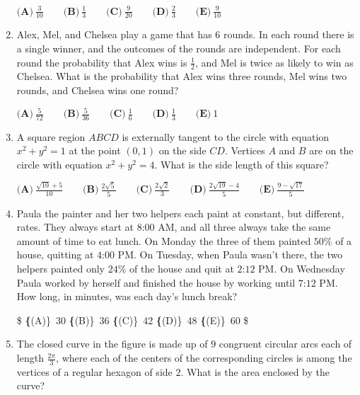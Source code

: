 \documentclass{article}
\begin{document}
\begin{enumerate}[label=\arabic*., itemsep=0.5em]
$ \textbf{(A)}\ \frac{3}{10}\qquad\textbf{(B)}\ \frac{1}{3}\qquad\textbf{(C)}\ \frac{9}{20}\qquad\textbf{(D)}\ \frac{2}{3}\qquad\textbf{(E)}\ \frac{9}{10} $\par \vspace{0.5em}\item Alex, Mel, and Chelsea play a game that has $6$ rounds.  In each round there is a single winner, and the outcomes of the rounds are independent.  For each round the probability that Alex wins is $\frac{1}{2}$, and Mel is twice as likely to win as Chelsea.  What is the probability that Alex wins three rounds, Mel wins two rounds, and Chelsea wins one round?

$ \textbf{(A)}\ \frac{5}{72}\qquad\textbf{(B)}\ \frac{5}{36}\qquad\textbf{(C)}\ \frac{1}{6}\qquad\textbf{(D)}\ \frac{1}{3}\qquad\textbf{(E)}\ 1 $\par \vspace{0.5em}\item A square region $ABCD$ is externally tangent to the circle with equation $x^2+y^2=1$ at the point $(0,1)$ on the side $CD$.  Vertices $A$ and $B$ are on the circle with equation $x^2+y^2=4$.  What is the side length of this square?

$ \textbf{(A)}\ \frac{\sqrt{10}+5}{10}\qquad\textbf{(B)}\ \frac{2\sqrt{5}}{5}\qquad\textbf{(C)}\ \frac{2\sqrt{2}}{3}\qquad\textbf{(D)}\ \frac{2\sqrt{19}-4}{5}\qquad\textbf{(E)}\ \frac{9-\sqrt{17}}{5} $\par \vspace{0.5em}\item Paula the painter and her two helpers each paint at constant, but different, rates.  They always start at $\text{8:00 AM}$, and all three always take the same amount of time to eat lunch.  On Monday the three of them painted $50\%$ of a house, quitting at $\text{4:00 PM}$.  On Tuesday, when Paula wasn't there, the two helpers painted only $24\%$ of the house and quit at $\text{2:12 PM}$.  On Wednesday Paula worked by herself and finished the house by working until $\text{7:12 PM}$.  How long, in minutes, was each day's lunch break?

\$ \textbf\{(A)\}\ 30
\qquad\textbf\{(B)\}\ 36
\qquad\textbf\{(C)\}\ 42
\qquad\textbf\{(D)\}\ 48
\qquad\textbf\{(E)\}\ 60
 \$\par \vspace{0.5em}\item The closed curve in the figure is made up of $9$ congruent circular arcs each of length $\frac{2\pi}{3}$, where each of the centers of the corresponding circles is among the vertices of a regular hexagon of side $2$. What is the area enclosed by the curve? 



\end{enumerate}
\end{document}
